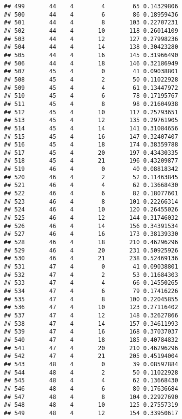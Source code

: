 \documentclass[
]{article}
\begin{document}
\begin{verbatim}
## 499       44    4        4        65 0.14329806
## 500       44    4        6        86 0.18959436
## 501       44    4        8       103 0.22707231
## 502       44    4       10       118 0.26014109
## 503       44    4       12       127 0.27998236
## 504       44    4       14       138 0.30423280
## 505       44    4       16       145 0.31966490
## 506       44    4       18       146 0.32186949
## 507       45    4        0        41 0.09038801
## 508       45    4        2        50 0.11022928
## 509       45    4        4        61 0.13447972
## 510       45    4        6        78 0.17195767
## 511       45    4        8        98 0.21604938
## 512       45    4       10       117 0.25793651
## 513       45    4       12       135 0.29761905
## 514       45    4       14       141 0.31084656
## 515       45    4       16       147 0.32407407
## 516       45    4       18       174 0.38359788
## 517       45    4       20       197 0.43430335
## 518       45    4       21       196 0.43209877
## 519       46    4        0        40 0.08818342
## 520       46    4        2        52 0.11463845
## 521       46    4        4        62 0.13668430
## 522       46    4        6        82 0.18077601
## 523       46    4        8       101 0.22266314
## 524       46    4       10       120 0.26455026
## 525       46    4       12       144 0.31746032
## 526       46    4       14       156 0.34391534
## 527       46    4       16       173 0.38139330
## 528       46    4       18       210 0.46296296
## 529       46    4       20       231 0.50925926
## 530       46    4       21       238 0.52469136
## 531       47    4        0        41 0.09038801
## 532       47    4        2        53 0.11684303
## 533       47    4        4        66 0.14550265
## 534       47    4        6        79 0.17416226
## 535       47    4        8       100 0.22045855
## 536       47    4       10       123 0.27116402
## 537       47    4       12       148 0.32627866
## 538       47    4       14       157 0.34611993
## 539       47    4       16       168 0.37037037
## 540       47    4       18       185 0.40784832
## 541       47    4       20       210 0.46296296
## 542       47    4       21       205 0.45194004
## 543       48    4        0        39 0.08597884
## 544       48    4        2        50 0.11022928
## 545       48    4        4        62 0.13668430
## 546       48    4        6        80 0.17636684
## 547       48    4        8       104 0.22927690
## 548       48    4       10       125 0.27557319
## 549       48    4       12       154 0.33950617

\end{verbatim}
\end{document}
